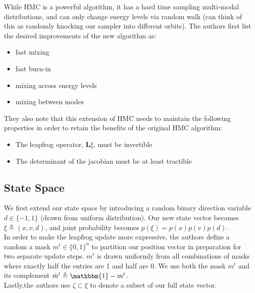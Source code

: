 \documentclass[twoside]{article}
\begin{document}
While HMC is a powerful algorithm, it has a hard time sampling multi-modal distributions, and can only change energy levels via random walk (can think of this as randomly knocking our sampler into different orbits). The authors first list the desired improvements of the new algorithm as:
\begin{itemize}
    \item fast mixing
    \item fast burn-in
    \item mixing across energy levels
    \item mixing between modes
\end{itemize}
They also note that this extension of HMC needs to maintain the following properties in order to retain the benefits of the original HMC algorithm:
\begin{itemize}
    \item The leapfrog operator, $\textbf{L}\xi$, must be invertible
    \item The determinant of the jacobian must be at least tractible
\end{itemize}

\subsection{State Space}
We first extend our state space by introducing a random binary direction variable $d\in \{-1,1\}$ (drawn from uniform distribution). Our new state vector becomes $\xi \triangleq (x,v,d)$, and joint probability becomes $p(\xi)=p(x)p(v)p(d)$. 
\\In order to make the leapfrog update more expressive, the authors define a random a mask $m^t \in \{0,1\}^n$ to partition our position vector in preparation for two separate update steps. $m^t$ is drawn uniformly from all combinations of masks where exactly half the entries are 1 and half are 0. We use both the mask  $m^t$ and its complement $\Bar{m}^t \triangleq \mathbbm{1}-m^t$. 
\\Lastly,the authors use $\zeta \subset \xi$ to denote a subset of our full state vector.
\end{document}
